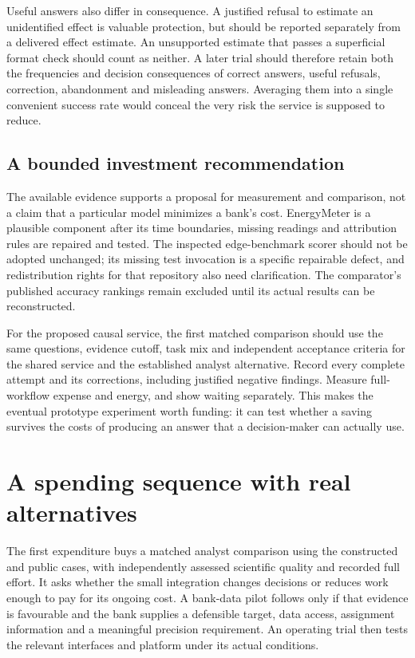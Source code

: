 Useful answers also differ in consequence. A justified refusal to estimate
an unidentified effect is valuable protection, but should be reported
separately from a delivered effect estimate. An unsupported estimate that
passes a superficial format check should count as neither. A later trial
should therefore retain both the frequencies and decision consequences of
correct answers, useful refusals, correction, abandonment and misleading
answers. Averaging them into a single convenient success rate would conceal
the very risk the service is supposed to reduce.

\subsection{A bounded investment recommendation}

The available evidence supports a proposal for measurement and comparison,
not a claim that a particular model minimizes a bank's cost. EnergyMeter is
a plausible component after its time boundaries, missing readings and
attribution rules are repaired and tested. The inspected edge-benchmark
scorer should not be adopted unchanged; its missing test invocation is a
specific repairable defect, and redistribution rights for that repository
also need clarification. The comparator's published accuracy rankings
remain excluded until its actual results can be reconstructed.

For the proposed causal service, the first matched comparison should use
the same questions, evidence cutoff, task mix and independent acceptance
criteria for the shared service and the established analyst alternative.
Record every complete attempt and its corrections, including justified
negative findings. Measure full-workflow expense and energy, and show
waiting separately. This makes the eventual prototype experiment worth
funding: it can test whether a saving survives the costs of producing an
answer that a decision-maker can actually use.

\section{A spending sequence with real alternatives}
The first expenditure buys a matched analyst comparison using the
constructed and public cases, with independently assessed scientific
quality and recorded full effort. It asks whether the small integration
changes decisions or reduces work enough to pay for its ongoing cost.
A bank-data pilot follows only if that evidence is favourable and the
bank supplies a defensible target, data access, assignment information
and a meaningful precision requirement. An operating trial then tests
the relevant interfaces and platform under its actual conditions.

